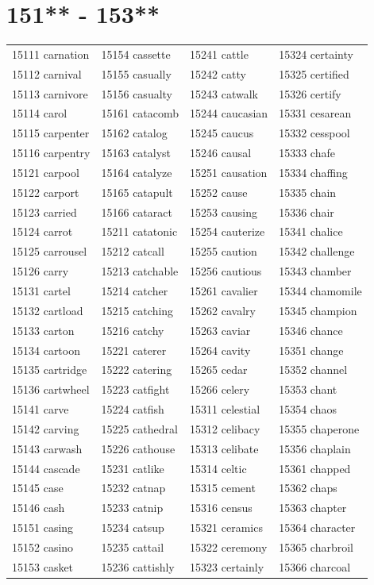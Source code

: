 \documentclass[10pt, oneside]{book}
\begin{document}
\begin{table}
	\centering
	\section*{151** - 153**}
	\begin{tabular}{l l l l}
15111 carnation &15154 cassette &15241 cattle &15324 certainty\\
15112 carnival &15155 casually &15242 catty &15325 certified\\
15113 carnivore &15156 casualty &15243 catwalk &15326 certify\\
15114 carol &15161 catacomb &15244 caucasian &15331 cesarean\\
15115 carpenter &15162 catalog &15245 caucus &15332 cesspool\\
15116 carpentry &15163 catalyst &15246 causal &15333 chafe\\
15121 carpool &15164 catalyze &15251 causation &15334 chaffing\\
15122 carport &15165 catapult &15252 cause &15335 chain\\
15123 carried &15166 cataract &15253 causing &15336 chair\\
15124 carrot &15211 catatonic &15254 cauterize &15341 chalice\\
15125 carrousel &15212 catcall &15255 caution &15342 challenge\\
15126 carry &15213 catchable &15256 cautious &15343 chamber\\
15131 cartel &15214 catcher &15261 cavalier &15344 chamomile\\
15132 cartload &15215 catching &15262 cavalry &15345 champion\\
15133 carton &15216 catchy &15263 caviar &15346 chance\\
15134 cartoon &15221 caterer &15264 cavity &15351 change\\
15135 cartridge &15222 catering &15265 cedar &15352 channel\\
15136 cartwheel &15223 catfight &15266 celery &15353 chant\\
15141 carve &15224 catfish &15311 celestial &15354 chaos\\
15142 carving &15225 cathedral &15312 celibacy &15355 chaperone\\
15143 carwash &15226 cathouse &15313 celibate &15356 chaplain\\
15144 cascade &15231 catlike &15314 celtic &15361 chapped\\
15145 case &15232 catnap &15315 cement &15362 chaps\\
15146 cash &15233 catnip &15316 census &15363 chapter\\
15151 casing &15234 catsup &15321 ceramics &15364 character\\
15152 casino &15235 cattail &15322 ceremony &15365 charbroil\\
15153 casket &15236 cattishly &15323 certainly &15366 charcoal\\
	\end{tabular}
 \end{table}
\clearpage
\end{document}
